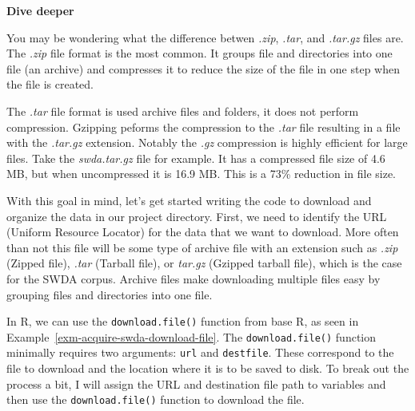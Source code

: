 \documentclass[
  letterpaper,
  krantz1]{latex/krantz-mod}
\theoremstyle{definition}
\theoremstyle{definition}
\theoremstyle{remark}
\begin{document}
\begin{tcolorbox}[enhanced jigsaw, leftrule=.75mm, colframe=quarto-callout-color-frame, left=2mm, colback=white, toprule=.15mm, breakable, arc=.35mm, opacityback=0, bottomrule=.15mm, rightrule=.15mm]

\textbf{ Dive deeper}

You may be wondering what the difference betwen \emph{.zip},
\emph{.tar}, and \emph{.tar.gz} files are. The \emph{.zip} file format
is the most common. It groups file and directories into one file (an
archive) and compresses it to reduce the size of the file in one step
when the file is created.

The \emph{.tar} file format is used archive files and folders, it does
not perform compression. Gzipping peforms the compression to the
\emph{.tar} file resulting in a file with the \emph{.tar.gz} extension.
Notably the \emph{.gz} compression is highly efficient for large files.
Take the \emph{swda.tar.gz} file for example. It has a compressed file
size of 4.6 MB, but when uncompressed it is 16.9 MB. This is a 73\%
reduction in file size.

\end{tcolorbox}

With this goal in mind, let's get started writing the code to download
and organize the data in our project directory. First, we need to
identify the URL (Uniform Resource Locator) for the data that we want to
download. More often than not this file will be some type of archive
file with an extension such as \emph{.zip} (Zipped file), \emph{.tar}
(Tarball file), or \emph{tar.gz} (Gzipped tarball file), which is the
case for the SWDA corpus. Archive files make downloading multiple files
easy by grouping files and directories into one file.

In R, we can use the \texttt{download.file()} function from base R, as
seen in Example~\ref{exm-acquire-swda-download-file}. The
\texttt{download.file()} function minimally requires two arguments:
\texttt{url} and \texttt{destfile}. These correspond to the file to
download and the location where it is to be saved to disk. To break out
the process a bit, I will assign the URL and destination file path to
variables and then use the \texttt{download.file()} function to download
the file.
\end{document}
